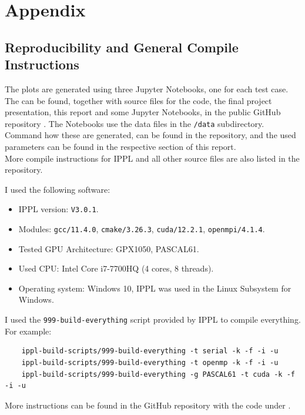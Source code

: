 
\section{Appendix}

\subsection{Reproducibility and General Compile Instructions}\label{sec:appendix:reproduce}

The plots are generated using three Jupyter Notebooks, one for each test case. The can be found, together with source files for the code, the final project presentation, this report and some Jupyter Notebooks, in the public GitHub repository \cite{aliemen2024}. The Notebooks use the data files in the \verb|/data| subdirectory. Command how these are generated, can be found in the repository, and the used parameters can be found in the respective section of this report. \\
More compile instructions for IPPL and all other source files are also listed in the repository.

I used the following software:
\begin{itemize}
    \item IPPL version: \texttt{V3.0.1}.
    \item Modules: \texttt{gcc/11.4.0}, \texttt{cmake/3.26.3}, \texttt{cuda/12.2.1}, \texttt{openmpi/4.1.4}.
    \item Tested GPU Architecture: GPX1050, PASCAL61.
    \item Used CPU: Intel Core i7-7700HQ (4 cores, 8 threads).
    \item Operating system: Windows 10, IPPL was used in the Linux Subsystem for Windows.
\end{itemize}
I used the \texttt{999-build-everything} script provided by IPPL to compile everything. For example:
\begin{verbatim}
    ippl-build-scripts/999-build-everything -t serial -k -f -i -u 
    ippl-build-scripts/999-build-everything -t openmp -k -f -i -u 
    ippl-build-scripts/999-build-everything -g PASCAL61 -t cuda -k -f -i -u 
\end{verbatim}
More instructions can be found in the GitHub repository with the code under \cite{aliemen2024}.



